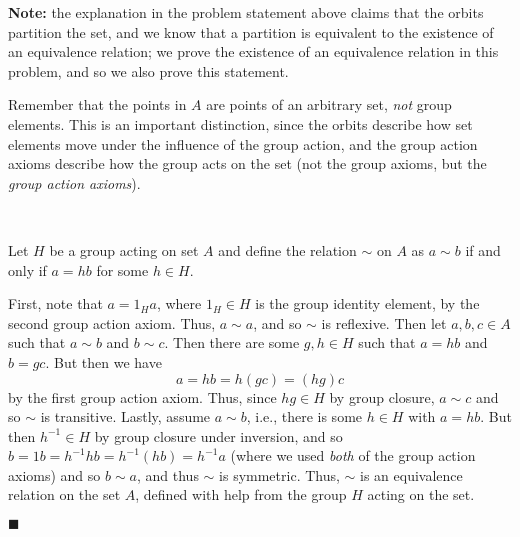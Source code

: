 \documentclass[12pt]{article}
\renewcommand{\qed}{\hfill$\blacksquare$}
\renewenvironment{proof}{\begin{addmargin}[1em]{0em}\begin{newproof}}{\end{newproof}\end{addmargin}\qed}
\begin{document}
{\color{red}\textbf{Note:} the explanation in the problem statement above claims that the orbits partition the set, and we know that a partition is equivalent to the existence of an equivalence relation; we prove the existence of an equivalence relation in this problem, and so we also prove this statement.

Remember that the points in $A$ are points of an arbitrary set, \textit{not} group elements. This is an important distinction, since the orbits describe how set elements move under the influence of the group action, and the group action axioms describe how the group acts on the set (not the group axioms, but the \textit{group action axioms}).}\\
\begin{proof}
Let $H$ be a group acting on set $A$ and define the relation $\sim$ on $A$ as $a\sim b$ if and only if $a=hb$ for some $h\in H$.

First, note that $a=1_H a$, where $1_H\in H$ is the group identity element, by the second group action axiom. Thus, $a\sim a$, and so $\sim$ is reflexive. Then let $a,b,c\in A$ such that $a\sim b$ and $b\sim c$. Then there are some $g,h\in H$ such that $a=hb$ and $b=gc$. But then we have $$ a = hb = h\left(gc\right) = \left(hg\right) c $$ by the first group action axiom. Thus, since $hg\in H$ by group closure, $a\sim c$ and so $\sim$ is transitive. Lastly, assume $a \sim b$, i.e., there is some $h\in H$ with $a=hb$. But then $h^{-1}\in H$ by group closure under inversion, and so $b = 1b = h^{-1}hb = h^{-1}\left(hb\right) = h^{-1}a $ (where we used \textit{both} of the group action axioms) and so $b\sim a$, and thus $\sim $ is symmetric. Thus, $\sim$ is an equivalence relation on the set $A$, defined with help from the group $H$ acting on the set.
\end{proof}
\end{document}
